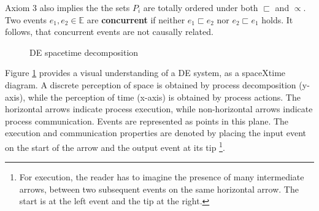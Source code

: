 \documentclass[11pt]{article}
\begin{document}
Axiom 3 also implies the the sets \(P_i\) are totally ordered under both \(\sqsubset\) and \(\propto\).
Two events \(e_1,e_2 \in \mathds{E}\) are \textbf{concurrent} if neither \(e_1 \sqsubset e_2\) nor \(e_2 \sqsubset e_1\) holds.
It follows, that concurrent events are not causally related.

\begin{figure}[htpb]
\centering
{}
\caption{DE spacetime decomposition} 
\label{fig:DE}
\end{figure}

Figure \ref{fig:DE} provides a visual understanding of a DE system, as a spaceXtime diagram.
A discrete perception of space is obtained by process decomposition (y-axis), while the perception of time (x-axis) is obtained by process actions.
The horizontal arrows indicate process execution, while non-horizontal arrows indicate process communication.
Events are represented as points in this plane.
The execution and communication properties are denoted by placing the input event on the start of the arrow and the output event at its tip \footnote{For execution, the reader has to imagine the presence of many intermediate arrows, between two subsequent events on the same horizontal arrow. The start is at the left event and the tip at the right.}.
\end{document}
